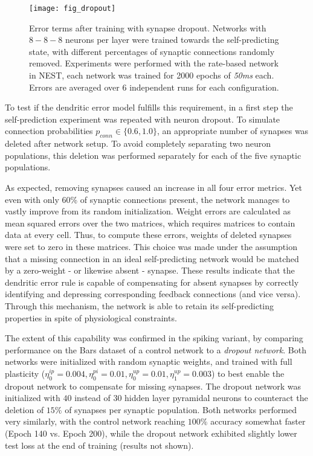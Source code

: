 \begin{figure}[h]
    \centering
    \texttt{[image: fig\_dropout]}
    \caption[Error terms after training with synapse dropout]{Error terms after training with synapse dropout. Networks
        with $8-8-8$ neurons per layer were trained towards the self-predicting state, with different percentages of
        synaptic connections randomly removed. Experiments were performed with the rate-based network in NEST, each
        network was trained for 2000 epochs of \textit{50ms} each. Errors are averaged over 6 independent runs for each
        configuration.}
    \label{fig-dropout}
\end{figure}

To test if the dendritic error model fulfills this requirement, in a first step the self-prediction experiment was
repeated with neuron dropout. To simulate connection probabilities $p_{conn} \in \{0.6, 1.0\}$, an appropriate number of
synapses was deleted after network setup. To avoid completely separating two neuron populations, this deletion was
performed separately for each of the five synaptic populations.

As expected, removing synapses caused an increase in all four error metrics. Yet even with only 60\% of synaptic
connections present, the network manages to vastly improve from its random initialization. Weight errors are calculated
as mean squared errors over the two matrices, which requires matrices to contain data at every cell. Thus, to compute
these errors, weights of deleted synapses were set to zero in these matrices. This choice was made under the assumption
that a missing connection in an ideal self-predicting network would be matched by a zero-weight - or likewise absent -
synapse. These results indicate that the dendritic error rule is capable of compensating for absent synapses by
correctly identifying and depressing corresponding feedback connections (and vice versa). Through this mechanism, the
network is able to retain its self-predicting properties in spite of physiological constraints.


The extent of this capability was confirmed in the spiking variant, by comparing performance on the Bars dataset of a
control network to a \textit{dropout network}. Both networks were initialized with random synaptic weights, and trained
with full plasticity ($\eta^{ip}_0 = 0.004, \eta^{pi}_0 = 0.01, \eta^{up}_0 = 0.01, \eta^{up}_1 = 0.003$) to best enable
the dropout network to compensate for missing synapses. The dropout network was initialized with $40$ instead of $30$
hidden layer pyramidal neurons to counteract the deletion of $15\%$ of synapses per synaptic population. Both networks
performed very similarly, with the control network reaching $100\%$ accuracy somewhat faster (Epoch 140 vs. Epoch 200),
while the dropout network exhibited slightly lower test loss at the end of training (results not shown).

